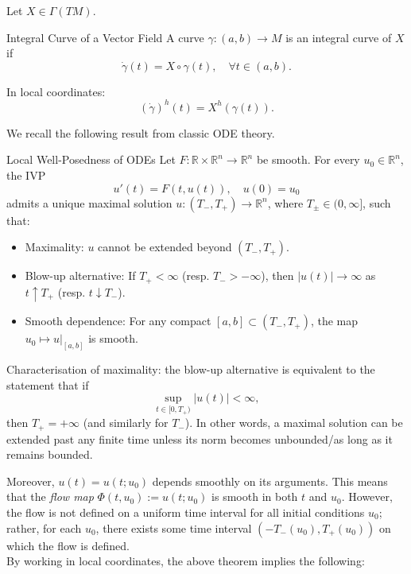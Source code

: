 Let $X \in \Gamma(TM)$.

\begin{colordef}{Integral Curve of a Vector Field}{}
A curve $\gamma: (a,b) \longrightarrow M$ is an integral curve of $X$ if
\[
\dot{\gamma}(t) = X\circ \gamma(t), \quad \forall t \in (a,b).
\]
\end{colordef}

In local coordinates:
\[
(\dot\gamma)^h(t) = X^h(\gamma(t)).
\]

We recall the following result from classic ODE theory.

\begin{colortheo}{Local Well-Posedness of ODEs}{}
Let $F:\mathbb{R}\times\mathbb{R}^n\to\mathbb{R}^n$ be smooth. For every $u_0\in\mathbb{R}^n$, the IVP
$$
u'(t)=F(t,u(t)), \quad u(0)=u_0
$$
admits a unique maximal solution $u:(T_-,T_+)\to\mathbb{R}^n$, where $T_\pm\in(0,\infty]$, such that:

\begin{itemize}
    \item Maximality: $u$ cannot be extended beyond $(T_-,T_+)$.
    \item Blow-up alternative: If $T_+<\infty$ (resp. $T_->-\infty$), then $|u(t)|\to\infty$ as $t\uparrow T_+$ (resp. $t\downarrow T_-$).
    \item Smooth dependence: For any compact $[a,b]\subset (T_-,T_+)$, the map $u_0 \mapsto u|_{[a,b]}$ is smooth.
\end{itemize}

\end{colortheo}

Characterisation of maximality: the blow-up alternative is equivalent to the statement that if
$$
\sup_{t \in [0,T_+)} |u(t)| < \infty,
$$
then $T_+ = +\infty$ (and similarly for $T_-$). In other words, a maximal solution can be extended past any finite time unless its norm becomes unbounded/as long as it remains bounded.


Moreover, $u(t) = u(t; u_0)$ depends smoothly on its arguments. This means that the \emph{flow map} $\Phi(t, u_0) := u(t; u_0)$ is smooth in both $t$ and $u_0$. However, the flow is not defined on a uniform time interval for all initial conditions $u_0$; rather, for each $u_0$, there exists some time interval $(-T_-(u_0), T_+(u_0))$ on which the flow is defined.\\

By working in local coordinates, the above theorem implies the following:

